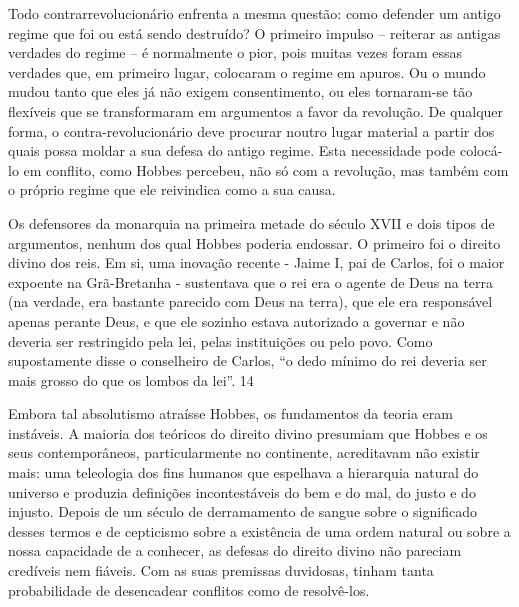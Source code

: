 
\par
 
Todo contrarrevolucionário enfrenta a mesma questão: como defender um antigo regime que foi ou está sendo destruído? O primeiro impulso – reiterar as antigas verdades do regime – é normalmente o pior, pois muitas vezes foram essas verdades que, em primeiro lugar, colocaram o regime em apuros. Ou o mundo mudou tanto que eles já não exigem consentimento, ou eles tornaram-se tão flexíveis que se transformaram em argumentos a favor da revolução. De qualquer forma, o contra-revolucionário deve procurar noutro lugar material a partir dos quais possa moldar a sua defesa do antigo regime. Esta necessidade pode colocá-lo em conflito, como Hobbes percebeu, não só com a revolução, mas também com o próprio regime que ele reivindica como a sua causa.
 
\par
 
Os defensores da monarquia na primeira metade do século XVII e dois tipos de argumentos, nenhum dos qual Hobbes poderia endossar. O primeiro foi o direito divino dos reis. Em si, uma inovação recente - Jaime I, pai de Carlos, foi o maior expoente na Grã-Bretanha - sustentava que o rei era o agente de Deus na terra (na verdade, era bastante parecido com Deus na terra), que ele era responsável apenas perante Deus, e que ele sozinho estava autorizado a governar e não deveria ser restringido pela lei, pelas instituições ou pelo povo. Como supostamente disse o conselheiro de Carlos, “o dedo mínimo do rei deveria ser mais grosso do que os lombos da lei”.
 {\color{blue} 14}  

 
\par
 
Embora tal absolutismo atraísse Hobbes, os fundamentos da teoria eram instáveis. A maioria dos teóricos do direito divino presumiam que Hobbes e os seus contemporâneos, particularmente no continente, acreditavam não existir mais: uma teleologia dos fins humanos que espelhava a hierarquia natural do universo e produzia definições incontestáveis ​​do bem e do mal, do justo e do injusto. Depois de um século de derramamento de sangue sobre o significado desses termos e de cepticismo sobre a existência de uma ordem natural ou sobre a nossa capacidade de a conhecer, as defesas do direito divino não pareciam credíveis nem fiáveis. Com as suas premissas duvidosas, tinham tanta probabilidade de desencadear conflitos como de resolvê-los.
 
\par
 
